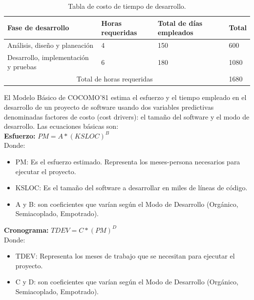 	\begin{table}[htbp]
		\begin{center}
			\begin{tabular}{|p{20mm}|p{30mm}|p{15mm}|p{15mm}|}
				\hline
				\textbf{Fase de desarrollo}  & \textbf{Horas requeridas} & \textbf{Total de días empleados} & \textbf{Total} \\ \hline 
				Análisis, diseño y planeación & 4 & 150 & 600 \\ \hline
				
				Desarrollo, implementación y pruebas & 6 & 180 & 1080 \\ \hline
				
				\multicolumn{3}{|c|}{Total de horas requeridas} & 1680\\ \hline
			\end{tabular}
			\caption{Tabla de costo de tiempo de desarrollo.}
			\label{tablacostodesarrollo}
		\end{center}
	\end{table}
	
	\noindent El Modelo Básico de COCOMO’81 estima el esfuerzo y el tiempo empleado en el desarrollo
	de un proyecto de software usando dos variables predictivas denominadas factores de costo (cost
	drivers): el tamaño del software y el modo de desarrollo. Las ecuaciones básicas son: \\
	\textbf{Esfuerzo:}
	$PM = A * (KSLOC)^{B} $\\
	
	\noindent Donde: 
	\begin{itemize}
		\item PM: Es el esfuerzo estimado. Representa los meses-persona necesarios para ejecutar el proyecto.
		\item KSLOC: Es el tamaño del software a desarrollar en miles de líneas de código.
		\item A y B: son coeficientes que varían según el Modo de Desarrollo (Orgánico, Semiacoplado, Empotrado).
	\end{itemize}
	
	\textbf{Cronograma:}
	$TDEV = C * (PM)^{D} $\\
	\noindent Donde: 
	\begin{itemize}
		\item TDEV: Representa los meses de trabajo que se necesitan para ejecutar el proyecto.
		\item C y D: son coeficientes que varían según el Modo de Desarrollo (Orgánico, Semiacoplado, Empotrado).
	\end{itemize}
	
